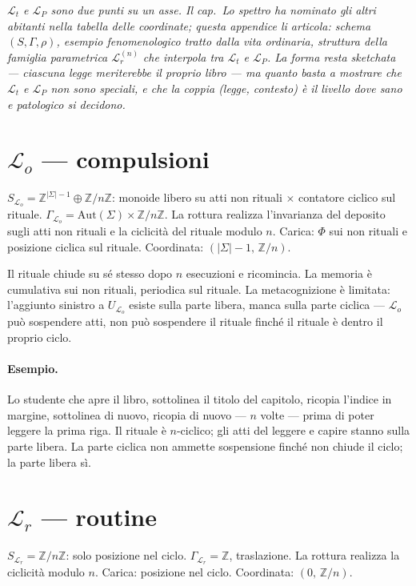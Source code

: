 \documentclass[
    oneside,                 %
    openany,                 %
    titlepage,
    11pt,
    a4paper,
    italian,
    DIV=14,                  %
    headinclude,
    footinclude=true,
    cleardoublepage=empty
]{scrbook}
\theoremstyle{ctplain}
\theoremstyle{ctdef}
\theoremstyle{ctrem}
\newcommand{\Lt}{\mathcal{L}_t}
\newcommand{\LP}{\mathcal{L}_P}
\newcommand{\Lo}{\mathcal{L}_o}
\newcommand{\Lr}{\mathcal{L}_r}
\newcommand{\Phii}{\Phi}
\begin{document}
\noindent\itshape $\Lt$ e $\LP$ sono due punti su un asse. Il cap.~\emph{Lo spettro} ha nominato gli altri abitanti nella tabella delle coordinate; questa appendice li articola: schema $(S, \Gamma, \rho)$, esempio fenomenologico tratto dalla vita ordinaria, struttura della famiglia parametrica $\Lr^{(n)}$ che interpola tra $\Lt$ e $\LP$. La forma resta sketchata --- ciascuna legge meriterebbe il proprio libro --- ma quanto basta a mostrare che $\Lt$ e $\LP$ non sono speciali, e che la coppia (legge, contesto) è il livello dove sano e patologico si decidono.\upshape

\bigskip

\section*{$\Lo$ --- compulsioni}

$S_{\Lo} = \mathbb{Z}^{|\Sigma|-1} \oplus \mathbb{Z}/n\mathbb{Z}$: monoide libero su atti non rituali $\times$ contatore ciclico sul rituale. $\Gamma_{\Lo} = \mathrm{Aut}(\Sigma) \times \mathbb{Z}/n\mathbb{Z}$. La rottura realizza l'invarianza del deposito sugli atti non rituali e la ciclicità del rituale modulo $n$. Carica: $\Phii$ sui non rituali e posizione ciclica sul rituale. Coordinata: $(|\Sigma|-1,\,\mathbb{Z}/n)$.

Il rituale chiude su sé stesso dopo $n$ esecuzioni e ricomincia. La memoria è cumulativa sui non rituali, periodica sul rituale. La metacognizione è limitata: l'aggiunto sinistro a $U_{\Lo}$ esiste sulla parte libera, manca sulla parte ciclica --- $\Lo$ può sospendere atti, non può sospendere il rituale finché il rituale è dentro il proprio ciclo.

\paragraph{Esempio.} Lo studente che apre il libro, sottolinea il titolo del capitolo, ricopia l'indice in margine, sottolinea di nuovo, ricopia di nuovo --- $n$ volte --- prima di poter leggere la prima riga. Il rituale è $n$-ciclico; gli atti del leggere e capire stanno sulla parte libera. La parte ciclica non ammette sospensione finché non chiude il ciclo; la parte libera sì.

\section*{$\Lr$ --- routine}

$S_{\Lr} = \mathbb{Z}/n\mathbb{Z}$: solo posizione nel ciclo. $\Gamma_{\Lr} = \mathbb{Z}$, traslazione. La rottura realizza la ciclicità modulo $n$. Carica: posizione nel ciclo. Coordinata: $(0,\,\mathbb{Z}/n)$.
\end{document}
